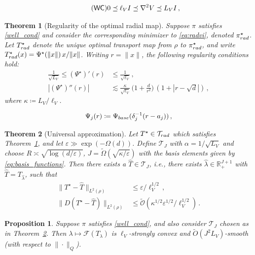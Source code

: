 \documentclass[10pt,a4paper]{amsart}
\newtheorem{theorem}{Theorem}
\newtheorem{prop}{Proposition}
\newcommand{\R}{\mathbb{R}}
\newcommand{\cF}{\mathcal{F}}
\newcommand{\cT}{\mathcal{T}}
\newcommand*{\defeq}{\coloneqq}
\newcommand{\eps}{\varepsilon}
\renewcommand{\epsilon}{\varepsilon}
\newcommand{\pirad}{\pi_{\rm rad}}
\begin{document}
\begin{align}\label{well_cond} \tag{$\mathsf{WC}$}
0 \preceq \ell_V I \preceq \nabla^2 V \preceq L_V I\,,
\end{align} 

\begin{theorem}[Regularity of the optimal radial map]\label{theorem_map_regularity} 
Suppose $\pi$ satisfies \eqref{well_cond} and consider the corresponding minimizer to \eqref{eq:radvi}, denoted $\pirad^\star$. Let $T^\star_{\rm{rad}}$ denote the unique optimal transport map from $\rho$ to $\pirad^\star$, and write $T_{\rm rad}^\star(x) = \Psi^\star(\|x\|)\,x/\|x\|$. Writing $r = \|x\|$, the following regularity conditions hold:
\begin{align*}
    \frac{1}{\sqrt{L_V}} \leq (\Psi^\star)'(r) &\leq \frac{1}{\sqrt{\ell_V}}\,, \\
    \left|(\Psi^\star)''(r) \right|
    &\lesssim
    {\frac{\kappa}{\sqrt{\ell_V}}\,\bigl(1 + \frac{d}{r^2}\bigr)\,(1+|r-\sqrt d|)}\,,
\end{align*}
where $\kappa \defeq L_V/\ell_V$.
\end{theorem}

\begin{align}\label{eq:basis_functions}
    {\Psi}_j(r) \defeq {\Psi}_{\rm base}(\delta_j^{-1}(r-a_j))\,,
\end{align}

\begin{theorem}[Universal approximation]\label{theorem_unif_approx}
Let $T^\star \in \cT_{\rm rad}$ which satisfies Theorem~\ref{theorem_map_regularity}, and let ${\epsilon \gg \exp(-\Omega(d))}$. Define $\cT_J$ with $\alpha = 1/\sqrt{L_V}$ and choose $R \asymp {\sqrt{\log(d/\epsilon)}}$, $J = {\widetilde{\Omega}(\sqrt{\kappa/\eps})}$ with the basis elements given by \eqref{eq:basis_functions}. Then there exists a $\hat{T} \in \cT_J$, i.e., there exists $\hat{\lambda} \in \R^{J+1}_+$ with $\hat{T} = T_{\hat{\lambda}}$, such that
\begin{align*}
    \|T^{\star} - \hat{T}\|_{L^2(\rho)} &\leq \epsilon/\ell_V^{1/2}\,,\\
    \|D(T^{\star} - \hat{T} ) \|_{L^2(\rho)} &\le {\widetilde{\mathcal{O}}(\kappa^{1/2} \epsilon^{1/2}/\ell_{V}^{1/2})}\,.
\end{align*}
\end{theorem}

\begin{prop}\label{prop:cf_smooth_convex}
Suppose $\pi$ satisfies \eqref{well_cond}, and also consider $\cT_J$ chosen as in Theorem~\ref{theorem_unif_approx}. Then $\lambda\mapsto \cF(T_\lambda)$ is $\ell_V$-strongly convex and ${\widetilde O(J^2 L_V)}$-smooth (with respect to $\|\cdot\|_Q$).
\end{prop}
\end{document}
